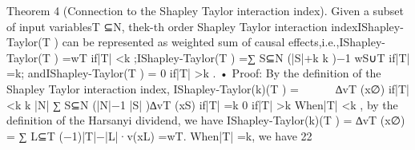 Theorem 4 (Connection to the Shapley Taylor interaction index). Given a subset of input variablesT ⊆N, thek-th order
Shapley Taylor interaction indexIShapley-Taylor(T ) can be represented as weighted sum of causal effects,i.e.,IShapley-Taylor(T ) =wT
if|T| <k ;IShapley-Taylor(T ) =∑
S⊆N\T
(|S|+k
k
)−1
wS∪T if|T| =k; andIShapley-Taylor(T ) = 0 if|T| >k .
• Proof: By the deﬁnition of the Shapley Taylor interaction index,
IShapley-Taylor(k)(T ) =



∆vT (x∅) if|T| <k
k
|N|
∑
S⊆N
(|N|−1
|S| )∆vT (xS) if|T| =k
0 if|T| >k
When|T| <k , by the deﬁnition of the Harsanyi dividend, we have
IShapley-Taylor(k)(T ) = ∆vT (x∅) =
∑
L⊆T
(−1)|T|−|L|·v(xL) =wT.
When|T| =k, we have
22
